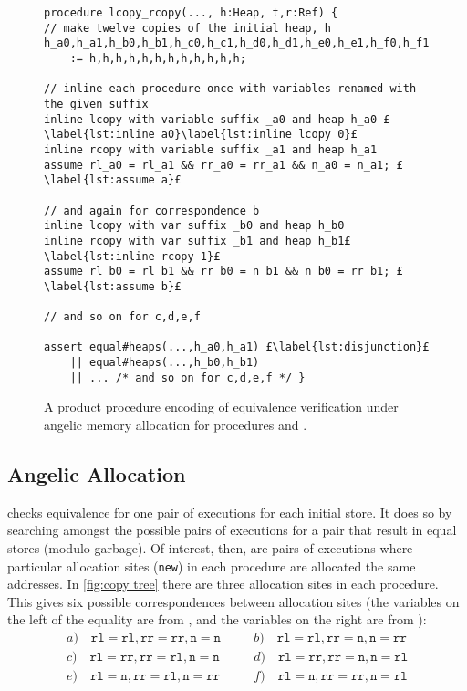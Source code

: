 \documentclass[runningheads,a4paper]{llncs}
\newcommand*{\news}{\texttt{new}}
\begin{document}
\begin{figure}[htbp]%
\centering%
\noindent\begin{lstlisting}[style=Boogie,firstnumber=auto,name=copyex]
procedure lcopy_rcopy(..., h:Heap, t,r:Ref) {
// make twelve copies of the initial heap, h
h_a0,h_a1,h_b0,h_b1,h_c0,h_c1,h_d0,h_d1,h_e0,h_e1,h_f0,h_f1 
    := h,h,h,h,h,h,h,h,h,h,h,h;

// inline each procedure once with variables renamed with the given suffix
inline lcopy with variable suffix _a0 and heap h_a0 £\label{lst:inline a0}\label{lst:inline lcopy 0}£
inline rcopy with variable suffix _a1 and heap h_a1
assume rl_a0 = rl_a1 && rr_a0 = rr_a1 && n_a0 = n_a1; £\label{lst:assume a}£

// and again for correspondence b
inline lcopy with var suffix _b0 and heap h_b0
inline rcopy with var suffix _b1 and heap h_b1£\label{lst:inline rcopy 1}£
assume rl_b0 = rl_b1 && rr_b0 = n_b1 && n_b0 = rr_b1; £\label{lst:assume b}£

// and so on for c,d,e,f

assert equal#heaps(...,h_a0,h_a1) £\label{lst:disjunction}£
    || equal#heaps(...,h_b0,h_b1) 
    || ... /* and so on for c,d,e,f */ }
\end{lstlisting}
\caption{A product procedure encoding of equivalence verification under angelic memory allocation for procedures \copylr{} and \copyrl{}.\label{fig:product}}
\end{figure}

\subsection{Angelic Allocation}

\Tool{} checks equivalence for one pair of executions for each initial store. It does so by searching amongst the possible pairs of executions for a pair that result in equal stores (modulo garbage). Of interest, then, are pairs of executions where particular allocation sites (\news{}) in each procedure are allocated the same addresses. In \cref{fig:copy tree} there are three allocation sites in each procedure.  This gives six possible correspondences between allocation sites (the variables on the left of the equality are from \copylr{}, and the variables on the right are from \copyrl{}):
\[\begin{aligned}
  a)\quad \mathtt{rl} = \mathtt{rl}, \mathtt{rr} = \mathtt{rr}, \mathtt{n} = \mathtt{n} &&\quad
  b)\quad \mathtt{rl} = \mathtt{rl}, \mathtt{rr} = \mathtt{n}, \mathtt{n} = \mathtt{rr} \\
  c)\quad \mathtt{rl} = \mathtt{rr}, \mathtt{rr} = \mathtt{rl}, \mathtt{n} = \mathtt{n} &&\quad
  d)\quad \mathtt{rl} = \mathtt{rr}, \mathtt{rr} = \mathtt{n}, \mathtt{n} = \mathtt{rl} \\
  e)\quad \mathtt{rl} = \mathtt{n}, \mathtt{rr} = \mathtt{rl}, \mathtt{n} = \mathtt{rr} &&\quad
  f)\quad \mathtt{rl} = \mathtt{n}, \mathtt{rr} = \mathtt{rr}, \mathtt{n} = \mathtt{rl}
\end{aligned}\]
\end{document}
